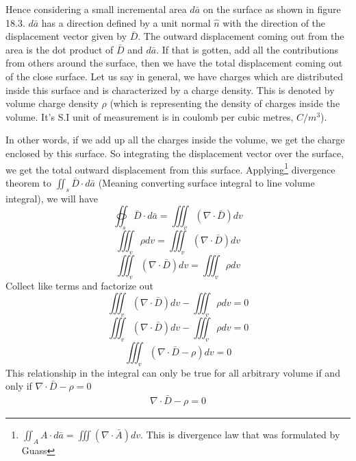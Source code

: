 Hence considering a small incremental area $ d\bar{a} $ on the surface as shown in figure 18.3. $ d\bar{a} $ has a direction defined by a unit normal $ \hat{n} $ with the direction of the displacement vector given by $ \bar{D} $. The outward displacement coming out from the area is the dot product of $ \bar{D} $ and $ d\bar{a} $. If that is gotten, add all the contributions from others around the surface, then we have the total displacement coming out of the close surface. Let us say in general, we have charges which are distributed inside this surface and is characterized by a charge density. This is denoted by volume charge density $ \rho $ (which is representing the density of charges inside the volume. It's S.I unit of measurement is in coulomb per cubic metres, $ C/m^{3} $).

In other words, if we add up all the charges inside the volume, we get the charge enclosed by this surface. So integrating the displacement vector over the surface, we get the total outward displacement from this surface. 
Applying\footnote[6]{$	\iint_A A\cdot d\bar{a} = \iiint (\nabla\cdot \bar{A})dv $. This is divergence law that was formulated by Guass} divergence theorem to  $\iint_s\bar{D}\cdot d\bar{a}$ (Meaning converting surface integral to line volume integral), we will have 
\begin{equation*}
\oiint_s\bar{D} \cdot d\bar{a} = \iiint_v(\nabla\cdot \bar{D})dv
\end{equation*}
\begin{equation*}
\iiint_v\rho dv = \iiint_v(\nabla\cdot \bar{D})dv
\end{equation*}
\begin{equation*}
\iiint_v(\nabla\cdot \bar{D})dv = \iiint_v\rho dv
\end{equation*}
Collect like terms and factorize out
\begin{equation*}
\iiint_v(\nabla\cdot \bar{D})dv - \iiint_v\rho dv = 0
\end{equation*}
\begin{equation*}
\iiint_v(\nabla\cdot \bar{D})dv - \iiint_v\rho dv = 0
\end{equation*}
\begin{equation*}
\iiint_v(\nabla\cdot \bar{D} - \rho)dv = 0
\end{equation*}
This relationship in the integral can only be
true for all arbitrary volume if and only if $\nabla\cdot\bar{D} - \rho = 0$
\begin{align*}
\nabla \cdot \bar{D} - \rho = 0
\end{align*}
